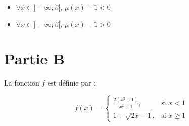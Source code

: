 \documentclass[12pt,a4paper]{article}
\begin{document}
\begin{itemize}
          \begin{center}
          \end{center}
          \begin{itemize}
              \item $\forall x \in ]-\infty ; \beta[$, $\mu(x)-1 < 0 $
              \item $\forall x \in ]-\infty ; \beta[$, $\mu(x)-1 > 0 $
          \end{itemize}
\end{itemize}

\section*{Partie B}

La fonction $f$ est définie par :

\[
    f(x) =
    \begin{cases}
        \frac{2(x^3+1)}{x^2+1}, & \text{si } x < 1    \\[10pt]
        1 + \sqrt{2x -1},       & \text{si } x \geq 1
    \end{cases}
\]
\end{document}

